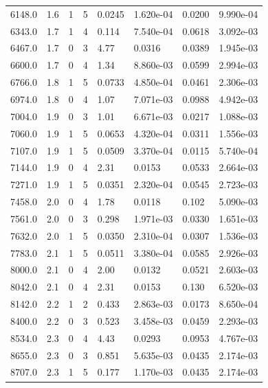 \documentclass[preview]{standalone}
\begin{document}
{{{\begin{tabular}{L{1.2cm}C{1.2cm} C{0.3cm}C{0.5cm} C{1.4cm}C{1.4cm} C{1.4cm}C{1.4cm}}
  6148.0  &   1.6  & 1     &  5 &  0.0245  & 1.620e-04  & 0.0200 &  9.990e-04   \\ 
  6343.0  &   1.7  & 1     &  4 &  0.114  & 7.540e-04  & 0.0618 &  3.092e-03   \\ 
  6467.0  &   1.7  & 0     &  3 &  4.77  & 0.0316  & 0.0389 &  1.945e-03   \\ 
  6600.0  &   1.7  & 0     &  4 &  1.34  & 8.860e-03  & 0.0599 &  2.994e-03   \\ 
  6766.0  &   1.8  & 1     &  5 &  0.0733  & 4.850e-04  & 0.0461 &  2.306e-03   \\ 
  6974.0  &   1.8  & 0     &  4 &  1.07  & 7.071e-03  & 0.0988 &  4.942e-03   \\ 
  7004.0  &   1.9  & 0     &  3 &  1.01  & 6.671e-03  & 0.0217 &  1.088e-03   \\ 
  7060.0  &   1.9  & 1     &  5 &  0.0653  & 4.320e-04  & 0.0311 &  1.556e-03   \\ 
  7107.0  &   1.9  & 1     &  5 &  0.0509  & 3.370e-04  & 0.0115 &  5.740e-04   \\ 
  7144.0  &   1.9  & 0     &  4 &  2.31  & 0.0153  & 0.0533 &  2.664e-03   \\ 
  7271.0  &   1.9  & 1     &  5 &  0.0351  & 2.320e-04  & 0.0545 &  2.723e-03   \\ 
  7458.0  &   2.0  & 0     &  4 &  1.78  & 0.0118  & 0.102 &  5.090e-03   \\ 
  7561.0  &   2.0  & 0     &  3 &  0.298  & 1.971e-03  & 0.0330 &  1.651e-03   \\ 
  7632.0  &   2.0  & 1     &  5 &  0.0350  & 2.310e-04  & 0.0307 &  1.536e-03   \\ 
  7783.0  &   2.1  & 1     &  5 &  0.0511  & 3.380e-04  & 0.0585 &  2.926e-03   \\ 
  8000.0  &   2.1  & 0     &  4 &  2.00  & 0.0132  & 0.0521 &  2.603e-03   \\ 
  8042.0  &   2.1  & 0     &  4 &  2.31  & 0.0153  & 0.130 &  6.520e-03   \\ 
  8142.0  &   2.2  & 1     &  2 &  0.433  & 2.863e-03  & 0.0173 &  8.650e-04   \\ 
  8400.0  &   2.2  & 0     &  3 &  0.523  & 3.458e-03  & 0.0459 &  2.293e-03   \\ 
  8534.0  &   2.3  & 0     &  4 &  4.43  & 0.0293  & 0.0953 &  4.767e-03   \\ 
  8655.0  &   2.3  & 0     &  3 &  0.851  & 5.635e-03  & 0.0435 &  2.174e-03   \\ 
  8707.0  &   2.3  & 1     &  5 &  0.177  & 1.170e-03  & 0.0435 &  2.174e-03   \\ 

\end{tabular}}}}
\end{document}
